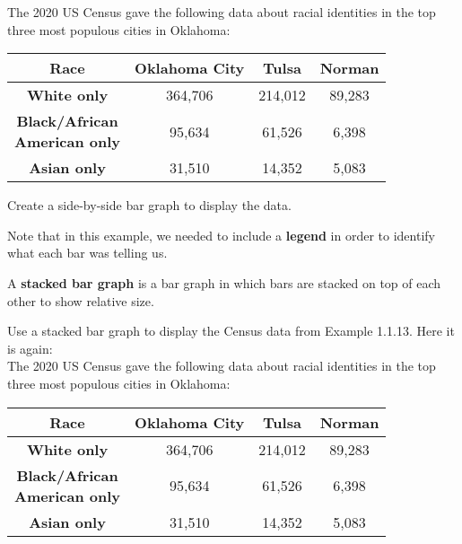 \documentclass[notes]{subfiles}
\begin{document}
		\begin{ex}
			The 2020 US Census gave the following data about racial identities in the top three most populous cities in Oklahoma:
			\begin{center}
				{
				\renewcommand{\arraystretch}{1.5}
				\begin{tabular}{|c|c|c|c|}\hline
					\textbf{Race} & \textbf{Oklahoma City} & \textbf{Tulsa} & \textbf{Norman}\\ \hline
					\textbf{White only} & 364,706 & 214,012 & 89,283 \\ \hline
					\makecell{\textbf{Black/African}\\ \textbf{American only}} & 95,634 & 61,526 & 6,398 \\ \hline
					\textbf{Asian only} & 31,510 & 14,352 & 5,083\\ \hline
				\end{tabular}
				}
			\end{center}
			Create a side-by-side bar graph to display the data.
		\end{ex}

		Note that in this example, we needed to include a \textbf{legend} in order to identify what each bar was telling us.

		\begin{defn}
			A \textbf{stacked bar graph} is a bar graph in which bars are stacked on top of each other to show relative size.
		\end{defn}

			\newpage

		\begin{ex}
			Use a stacked bar graph to display the Census data from Example 1.1.13.  Here it is again:\\[10pt]

			The 2020 US Census gave the following data about racial identities in the top three most populous cities in Oklahoma:
			\begin{center}
				{
				\renewcommand{\arraystretch}{1.5}
				\begin{tabular}{|c|c|c|c|}\hline
					\textbf{Race} & \textbf{Oklahoma City} & \textbf{Tulsa} & \textbf{Norman}\\ \hline
					\textbf{White only} & 364,706 & 214,012 & 89,283 \\ \hline
					\makecell{\textbf{Black/African}\\ \textbf{American only}} & 95,634 & 61,526 & 6,398 \\ \hline
					\textbf{Asian only} & 31,510 & 14,352 & 5,083\\ \hline
				\end{tabular}
				}
			\end{center}
		\end{ex}
\end{document}
